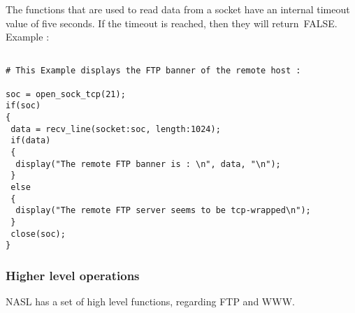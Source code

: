 \documentclass{article}
\begin{document}
The functions that are used to read data from a socket have an internal
timeout value of five seconds. If the timeout is reached, then they will
return~FALSE.\\
\noindent Example :
\begin{verbatim}

# This Example displays the FTP banner of the remote host :

soc = open_sock_tcp(21);
if(soc)
{
 data = recv_line(socket:soc, length:1024);
 if(data)
 {
  display("The remote FTP banner is : \n", data, "\n");
 }
 else
 {
  display("The remote FTP server seems to be tcp-wrapped\n");
 }
 close(soc);
}

\end{verbatim}

\subsubsection{Higher level operations}

NASL has a set of high level functions, regarding FTP and WWW.
\end{document}
